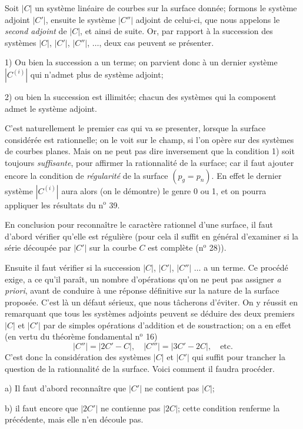 \documentclass{article}
\begin{document}
Soit $|C|$ un système linéaire de courbes sur la surface donnée; formons le système adjoint $|C'|$, ensuite le système $|C''|$ adjoint de celui-ci, que nous appelons le \emph{second adjoint} de $|C|$, et ainsi de suite. Or, par rapport à la succession des systèmes $|C|$, $|C'|$, $|C''|$, $\ldots$, deux cas peuvent se présenter.

1) Ou bien la succession a un terme; on parvient donc à un dernier système $|C^{(i)}|$ qui n'admet plus de système adjoint;

2) ou bien la succession est illimitée; chacun des systèmes qui la composent admet le système adjoint.

C'est naturellement le premier cas qui va se presenter, lorsque la surface considérée est rationnelle; on le voit sur le champ, si l'on opère sur des systèmes de courbes planes. Mais on ne peut pas dire inversement que la condition 1) soit toujours \emph{suffisante}, pour affirmer la rationnalité de la surface; car il faut ajouter encore la condition de \emph{régularité} de la surface $(p_{g} = p_{n})$. En effet le dernier système $|C^{(i)}|$ aura alors (on le démontre) le genre 0 ou 1, et on pourra appliquer les résultats du n${}^{\text{o}}$ 39.

En conclusion pour reconnaître le caractère rationnel d'une surface, il faut d'abord vérifier qu'elle est régulière (pour cela il suffit en général d'examiner si la série découpée par $|C'|$ sur la courbe $C$ est complète (n${}^{\text{o}}$ 28)).

Ensuite il faut vérifier si la succession $|C|$, $|C'|$, $|C''|$ $\ldots$ a un terme. Ce procédé exige, a ce qu'il paraît, un nombre d'opérations qu'on ne peut pas assigner \emph{a priori}, avant de conduire à une réponse définitive sur la nature de la surface proposée. C'est là un défaut sérieux, que nous tâcherons d'éviter. On y réussit en remarquant que tous les systèmes adjoints peuvent se déduire des deux premiers $|C|$ et $|C'|$ par de simples opérations d'addition et de soustraction; on a en effet (en vertu du théorème fondamental n${}^{\text{o}}$ 16)
\[ |C''| = |2C' - C|, \quad |C'''| = |3C' - 2C|, \quad \text{etc.} \]
C'est donc la considération des systèmes $|C|$ et $|C'|$ qui suffit pour trancher la question de la rationnalité de la surface. Voici comment il faudra procéder.

a) Il faut d'abord reconnaître que $|C'|$ ne contient pas $|C|$;


b) il faut encore que $|2C'|$ ne contienne pas $|2C|$; cette condition renferme la précédente, mais elle n'en découle pas.
\end{document}
